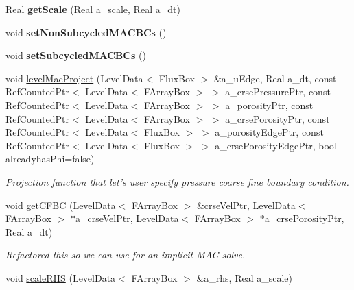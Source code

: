 \begin{DoxyCompactItemize}
\item 
\hypertarget{class_c_c_projector_a1f70af91475a0f1654a6dabfc7ca9ac7}{Real {\bfseries get\-Scale} (Real a\-\_\-scale, Real a\-\_\-dt)}\label{class_c_c_projector_a1f70af91475a0f1654a6dabfc7ca9ac7}

\item 
\hypertarget{class_c_c_projector_a1ecab9203ea2a6748434d3b8ece0dc7f}{void {\bfseries set\-Non\-Subcycled\-M\-A\-C\-B\-Cs} ()}\label{class_c_c_projector_a1ecab9203ea2a6748434d3b8ece0dc7f}

\item 
\hypertarget{class_c_c_projector_a2ec3a7069c9f9910cb766dd37ed46ac3}{void {\bfseries set\-Subcycled\-M\-A\-C\-B\-Cs} ()}\label{class_c_c_projector_a2ec3a7069c9f9910cb766dd37ed46ac3}

\item 
\hypertarget{class_c_c_projector_a3ccedca3d35f9f45dff8c4b8eee5fd57}{void \hyperlink{class_c_c_projector_a3ccedca3d35f9f45dff8c4b8eee5fd57}{level\-Mac\-Project} (Level\-Data$<$ Flux\-Box $>$ \&a\-\_\-u\-Edge, Real a\-\_\-dt, const Ref\-Counted\-Ptr$<$ Level\-Data$<$ F\-Array\-Box $>$ $>$ a\-\_\-crse\-Pressure\-Ptr, const Ref\-Counted\-Ptr$<$ Level\-Data$<$ F\-Array\-Box $>$ $>$ a\-\_\-porosity\-Ptr, const Ref\-Counted\-Ptr$<$ Level\-Data$<$ F\-Array\-Box $>$ $>$ a\-\_\-crse\-Porosity\-Ptr, const Ref\-Counted\-Ptr$<$ Level\-Data$<$ Flux\-Box $>$ $>$ a\-\_\-porosity\-Edge\-Ptr, const Ref\-Counted\-Ptr$<$ Level\-Data$<$ Flux\-Box $>$ $>$ a\-\_\-crse\-Porosity\-Edge\-Ptr, bool alreadyhas\-Phi=false)}\label{class_c_c_projector_a3ccedca3d35f9f45dff8c4b8eee5fd57}

\begin{DoxyCompactList}\small\item\em Projection function that let's user specify pressure coarse fine boundary condition. \end{DoxyCompactList}\item 
\hypertarget{class_c_c_projector_ae42a597ab7f71cf7e1162e31f1cd407f}{void \hyperlink{class_c_c_projector_ae42a597ab7f71cf7e1162e31f1cd407f}{get\-C\-F\-B\-C} (Level\-Data$<$ F\-Array\-Box $>$ \&crse\-Vel\-Ptr, Level\-Data$<$ F\-Array\-Box $>$ $\ast$a\-\_\-crse\-Vel\-Ptr, Level\-Data$<$ F\-Array\-Box $>$ $\ast$a\-\_\-crse\-Porosity\-Ptr, Real a\-\_\-dt)}\label{class_c_c_projector_ae42a597ab7f71cf7e1162e31f1cd407f}

\begin{DoxyCompactList}\small\item\em Refactored this so we can use for an implicit M\-A\-C solve. \end{DoxyCompactList}\item 
\hypertarget{class_c_c_projector_ac693b442a9420260d2d1d0720a8b1f1a}{void \hyperlink{class_c_c_projector_ac693b442a9420260d2d1d0720a8b1f1a}{scale\-R\-H\-S} (Level\-Data$<$ F\-Array\-Box $>$ \&a\-\_\-rhs, Real a\-\_\-scale)}\label{class_c_c_projector_ac693b442a9420260d2d1d0720a8b1f1a}


\end{DoxyCompactItemize}

